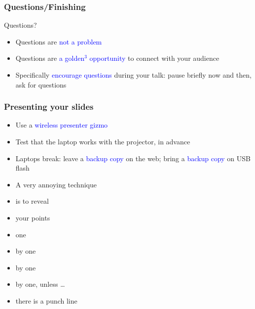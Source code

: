\documentclass[aspectratio=43,10pt,ucs]{beamer} %
\begin{document}
\begin{frame}
  \frametitle{Questions/Finishing}

  \alert{Questions?}
  \begin{itemize}
  \item Questions are \textcolor{blue}{not a problem}
  \item Questions are \textcolor{blue}{a golden$^3$ opportunity} to
    connect with your audience
  \item Specifically \textcolor{blue}{encourage questions} during your
    talk: pause briefly now and then, ask for questions
  \end{itemize}

  \vspace*{1em}


\end{frame}
\begin{frame}
  \frametitle{Presenting your slides}

  \begin{itemize}
  \item Use a \textcolor{blue}{wireless presenter gizmo}
  \item \alert{Test} that the laptop works with the projector, in
    advance
  \item Laptops break: leave a \textcolor{blue}{backup copy} on the
    web; bring a \textcolor{blue}{backup copy} on USB flash
  \end{itemize}

  \vspace*{1em}

  \begin{itemize}[<+->]
  \item A very annoying technique
  \item is to reveal
  \item your points
  \item one
  \item by one
  \item by one
  \item by one, unless …
  \item there is a \alert{punch line}
  \end{itemize}

\end{frame}
\end{document}
